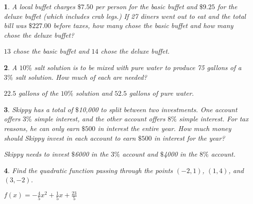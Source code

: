 \documentclass{amsbook}
\newtheorem{exc}{}
\newenvironment{ex}{\begin{exc}\normalfont}{\end{exc}}
\numberwithin{section}{chapter}
\numberwithin{equation}{chapter}
\begin{document}
\begin{ex}
	A local buffet charges $\$7.50$ per person for the basic buffet and $\$9.25$ for the deluxe buffet (which includes crab legs.)  If 27 diners went out to eat and the total bill was $\$227.00$ before taxes, how many chose the basic buffet and how many chose the deluxe buffet?
	\begin{sol}
		$13$ chose the basic buffet and $14$ chose the deluxe buffet.
	\end{sol}
\end{ex}


\begin{ex}
	A $10 \%$ salt solution is to be mixed with pure water to produce 75 gallons of a $3\%$ salt solution.  How much of each are needed?
	\begin{sol}
		$22.5$ gallons of the $10 \%$ solution and $52.5$ gallons of pure water.
	\end{sol}
\end{ex}

\begin{ex}
	Skippy has a total of $\$$10,000 to split between two investments.  One account offers $3\%$ simple interest, and the other account offers $8\%$ simple interest.  For tax reasons, he can only earn $\$500$ in interest the entire year.  How much money should Skippy invest in each account to earn $\$500$ in interest for the year?
	\begin{sol}
		Skippy needs to invest $\$$6000 in the $3\%$ account and $\$$4000 in the $8 \%$ account.
	\end{sol}
\end{ex}

\begin{comment}
\begin{ex}
	It's time for another meal at our local buffet.  This time, 22 diners (5 of whom were children) feasted for $\$162.25$, before taxes.  If the kids buffet is $\$4.50$, the basic buffet is $\$7.50$, and the deluxe buffet (with crab legs) is $\$9.25$, find out how many diners chose the deluxe buffet. 
	\begin{sol}
		This time, 7 diners chose the deluxe buffet.
	\end{sol}
\end{ex}
\end{comment}


\begin{ex}
	Find the quadratic function passing through the points $(-2,1)$, $(1,4)$, and $(3,-2)$.
	\begin{sol}
		$f(x) = -\frac{4}{5} x^2+\frac{1}{5} x + \frac{23}{5}$
	\end{sol}
\end{ex}
\end{document}
